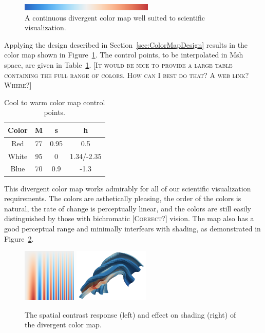 \documentclass[twocolumn]{article}
\newcommand{\sticky}[1]{\textsc{[#1]}}
\newcommand{\Msh}{Msh\xspace}
\begin{document}
\begin{figure}
  \centering
  \includegraphics[width=2.5in]{images/Cool2WarmBar}
  \caption{A continuous divergent color map well suited to scientific
    visualization.}
  \label{fig:Cool2WarmBar}
\end{figure}

Applying the design described in Section~\ref{sec:ColorMapDesign} results
in the color map shown in Figure~\ref{fig:Cool2WarmBar}.  The control
points, to be interpolated in \Msh space, are given in
Table~\ref{table:Cool2Warm}.  \sticky{It would be nice to provide a large
  table containing the full range of colors.  How can I best do that?  A
  web link?  Where?}

\begin{table}
  \centering
  \caption{Cool to warm color map control points.}
  \begin{tabular}{c@{\qquad}ccc}
    Color & M & s & h \\
    \hline
    Red & 77 & 0.95 & 0.5 \\
    White & 95 & 0 & 1.34/-2.35 \\
    Blue & 70 & 0.9 & -1.3
  \end{tabular}
  \label{table:Cool2Warm}
\end{table}

This divergent color map works admirably for all of our scientific
visualization requirements.  The colors are asthetically pleasing, the
order of the colors is natural, the rate of change is perceptually linear,
and the colors are still easily distinguished by those with bichromatic
\sticky{Correct?} vision.  The map also has a good perceptual range and
minimally interfears with shading, as demonstrated in
Figure~\ref{fig:Cool2WarmResponse}.

\begin{figure}
  \centering
  \includegraphics[height=1in]{images/Cool2WarmSpatialContrast}
  \quad
  \includegraphics[height=1in]{images/Cool2WarmShading}
  \caption{The spatial contrast response (left) and effect on shading
    (right) of the divergent color map.}
  \label{fig:Cool2WarmResponse}
\end{figure}
\end{document}
